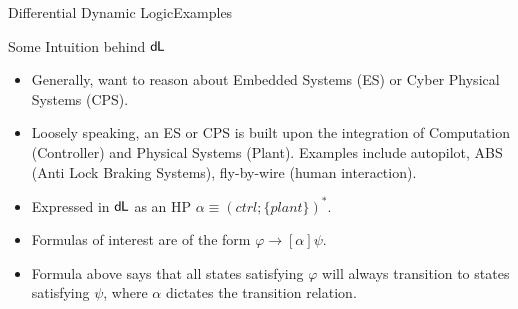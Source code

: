 \documentclass{beamer}
\newcommand{\dL}{\text{\upshape\textsf{d{\kern-0.05em}L}}}
\begin{document}
\begin{frame}{Differential Dynamic Logic}{Examples}
  \begin{block}{Some Intuition behind $\dL$}
  \begin{itemize}
    \item Generally, want to reason about Embedded Systems (ES) or Cyber Physical Systems (CPS).
      \pause
    \item Loosely speaking, an ES or CPS is built upon the integration of Computation (Controller) and
      Physical Systems (Plant). Examples include autopilot, ABS (Anti Lock
      Braking Systems), fly-by-wire (human interaction).
    \item Expressed in $\dL$ as an HP $\alpha \equiv (ctrl ; \{plant\})^*$.
      \pause
    \item Formulas of interest are of the form $\varphi \to [\alpha]\psi$.
    \item Formula above says that all states satisfying $\varphi$ will
      always transition to states satisfying $\psi$, where $\alpha$ dictates
      the transition relation.
  \end{itemize}
\end{block}
\end{frame}
\end{document}
